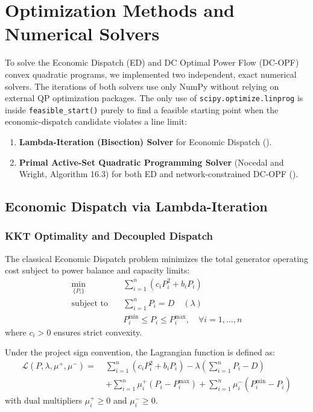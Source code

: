 
\section{Optimization Methods and Numerical Solvers}
\label{sec:methods}

To solve the Economic Dispatch (ED) and DC Optimal Power Flow (DC-OPF) convex quadratic programs, we implemented two independent, exact numerical solvers. The iterations of both solvers use only NumPy without relying on external QP optimization packages. The only use of \texttt{scipy.optimize.linprog} is inside \texttt{feasible\_start()} purely to find a feasible starting point when the economic-dispatch candidate violates a line limit:
\begin{enumerate}
    \item \textbf{Lambda-Iteration (Bisection) Solver} for Economic Dispatch ().
    \item \textbf{Primal Active-Set Quadratic Programming Solver} (Nocedal and Wright, Algorithm 16.3) for both ED and network-constrained DC-OPF ().
\end{enumerate}

\subsection{Economic Dispatch via Lambda-Iteration}

\subsubsection{KKT Optimality and Decoupled Dispatch}
The classical Economic Dispatch problem minimizes the total generator operating cost subject to power balance and capacity limits:
\begin{align}
    \min_{\{P_i\}} \quad & \sum_{i=1}^n \left( c_i P_i^2 + b_i P_i \right) \label{eq:ed_obj} \\
    \text{subject to} \quad & \sum_{i=1}^n P_i = D \quad (\lambda) \label{eq:ed_bal} \\
    & P_i^{\min} \le P_i \le P_i^{\max}, \quad \forall i = 1, \dots, n \label{eq:ed_bounds}
\end{align}
where $c_i > 0$ ensures strict convexity.

Under the project sign convention, the Lagrangian function is defined as:
\begin{equation}
\begin{split}
    \mathcal{L}(P, \lambda, \mu^+, \mu^-) = \; & \sum_{i=1}^n (c_i P_i^2 + b_i P_i) - \lambda \left(\sum_{i=1}^n P_i - D\right) \\
    & + \sum_{i=1}^n \mu_i^+ (P_i - P_i^{\max}) + \sum_{i=1}^n \mu_i^- (P_i^{\min} - P_i)
\end{split}
\end{equation}
with dual multipliers $\mu_i^+ \ge 0$ and $\mu_i^- \ge 0$.

